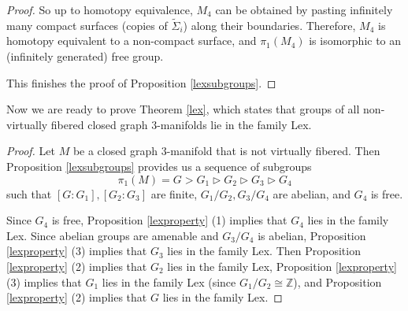 \documentclass{amsart}
\numberwithin{equation}{section}
\theoremstyle{definition}
\begin{document}
\begin{proof}
So up to homotopy equivalence, $M_4$ can be obtained by pasting infinitely many compact surfaces (copies of $\tilde{\Sigma}_i$) along their boundaries. Therefore, $M_4$ is homotopy equivalent to a non-compact surface, and $\pi_1(M_4)$ is isomorphic to an (infinitely generated) free group.

This finishes the proof of Proposition \ref{lexsubgroups}.
\end{proof}

Now we are ready to prove Theorem \ref{lex}, which states that groups of all non-virtually fibered closed graph $3$-manifolds lie in the family Lex.

\begin{proof}




Let $M$ be a closed graph $3$-manifold that is not virtually fibered.
Then Proposition \ref{lexsubgroups} provides us a sequence of subgroups 
$$\pi_1(M)=G>G_1\vartriangleright G_2\vartriangleright G_3\vartriangleright G_4$$
such that $[G:G_1],[G_2:G_3]$ are finite, $G_1/G_2,G_3/G_4$ are abelian, and $G_4$ is free.

Since $G_4$ is free, Proposition \ref{lexproperty} (1) implies that $G_4$ lies in the family Lex. Since abelian groups are amenable and $G_3/G_4$ is abelian, Proposition \ref{lexproperty} (3) implies that $G_3$ lies in the family Lex. Then Proposition \ref{lexproperty} (2) implies that $G_2$ lies in the family Lex, Proposition \ref{lexproperty} (3) implies that $G_1$ lies in the family Lex (since $G_1/G_2\cong \mathbb{Z}$), and Proposition \ref{lexproperty} (2) implies that $G$ lies in the family Lex.

\end{proof}
\end{document}
